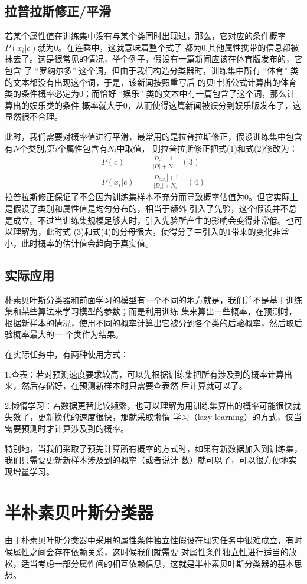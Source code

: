\documentclass[UTF8]{ctexart}
\begin{document}
{\subsection{拉普拉斯修正/平滑}
若某个属性值在训练集中没有与某个类同时出现过，那么，它对应的条件概率$P(x_i|c)$就为0。在连乘中，这就意味着整个式子
都为0,其他属性携带的信息都被抹去了。这是很常见的情况，举个例子，假设有一篇新闻应该在体育版发布的，它包含
了 “罗纳尔多” 这个词，但由于我们构造分类器时，训练集中所有 “体育” 类的文本都没有出现这个词，于是，该新闻按照重写后
的贝叶斯公式计算出的体育类的条件概率必定为0；而恰好 “娱乐” 类的文本中有一篇包含了这个词，那么计算出的娱乐类的条件
概率就大于0，从而使得这篇新闻被误分到娱乐版发布了，这显然很不合理。\par
此时，我们需要对概率值进行平滑，最常用的是拉普拉斯修正，假设训练集中包含有$N$个类别,第$i$个属性包含有$N_i$中取值，
则拉普拉斯修正把式(1)和式(2)修改为：
\begin{align*}
        P(c)&=\frac{|D_c|+1}{|D|+N}\quad(3)\\[2ex]
        P(x_i|c)&=\frac{|D_{c,x_i}|+1}{|D_c|+N_i}\quad(4)
\end{align*}
拉普拉斯修正保证了不会因为训练集样本不充分而导致概率估值为0。但它实际上是假设了类别和属性值是均匀分布的，相当于额外
引入了先验，这个假设并不总是成立。不过当训练集规模足够大时，引入先验所产生的影响会变得非常低。也可以理解为，此时式
(3)和式(4)的分母很大，使得分子中引入的1带来的变化非常小，此时概率的估计值会趋向于真实值。\newpage
\subsection{实际应用}
朴素贝叶斯分类器和前面学习的模型有一个不同的地方就是，我们并不是基于训练集和某些算法来学习模型的参数；而是利用训练
集来算出一些概率，在预测时，根据新样本的情况，使用不同的概率计算出它被分到各个类的后验概率，然后取后验概率最大的一
个类作为结果。\par
在实际任务中，有两种使用方式：\par
1.查表：若对预测速度要求较高，可以先根据训练集把所有涉及到的概率计算出来，然后存储好，在预测新样本时只需要查表然
后计算就可以了。\par
2.懒惰学习：若数据更替比较频繁，也可以理解为用训练集算出的概率可能很快就失效了，更新换代的速度很快，那就采取懒惰
学习（lazy learning）的方式，仅当需要预测时才计算涉及到的概率。\par
特别地，当我们采取了预先计算所有概率的方式时，如果有新数据加入到训练集，我们只需要更新新样本涉及到的概率（或者说计
数）就可以了，可以很方便地实现增量学习。\newpage
\section{半朴素贝叶斯分类器}
由于朴素贝叶斯分类器中采用的属性条件独立性假设在现实任务中很难成立，有时候属性之间会存在依赖关系，这时候我们就需要
对属性条件独立性进行适当的放松，适当考虑一部分属性间的相互依赖信息，这就是半朴素贝叶斯分类器的基本思想。\par

}
\end{document}

